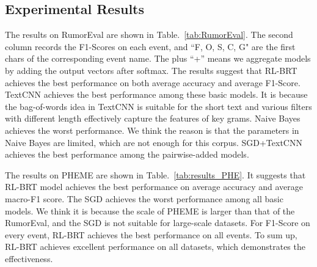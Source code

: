 \begin{table}[htbp]
	\caption{RumorEval}
	\centering
	\label{tab:RumorEval}
\end{table}


\subsection{Experimental Results}
The results on RumorEval are shown in Table.~{\ref{tab:RumorEval}}. The second column records the F1-Scores on each event, and ``F, O, S, C, G" are the first chars of the corresponding event name. The plus ``+'' means we aggregate models by adding the output vectors after softmax. The results suggest that RL-BRT achieves the best performance on both average accuracy and average F1-Score. TextCNN achieves the best performance among these basic models. It is because the bag-of-words idea in TextCNN is suitable for the short text and various filters with different length effectively capture the features of key grams. Naive Bayes achieves the worst performance. We think the reason is that the parameters in Naive Bayes are limited, which are not enough for this corpus. SGD+TextCNN achieves the best performance among the pairwise-added models. 

The results on PHEME are shown in Table.~\ref{tab:results_PHE}. It suggests that RL-BRT model achieves the best performance on average accuracy and average macro-F1 score. The SGD achieves the worst performance among all basic models. We think it is because the scale of PHEME is larger than that of the RumorEval, and the SGD is not suitable for large-scale datasets. For F1-Score on every event, RL-BRT achieves the best performance on all events. To sum up, RL-BRT achieves excellent performance on all datasets, which demonstrates the effectiveness.

